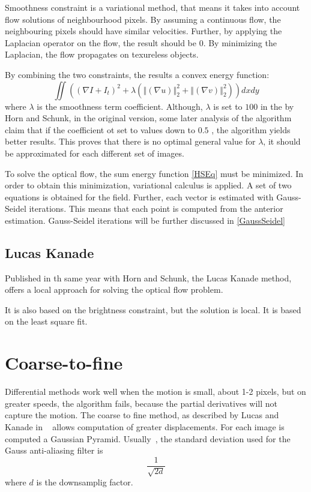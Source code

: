\documentclass[12pt,a4paper,twoside]{report}
\begin{document}
Smoothness constraint is a variational method, that means it takes into account flow solutions of neighbourhood pixels. By assuming a continuous flow, the neighbouring pixels should have similar velocities\cite{HSOpticalFlow}. Further, by applying the Laplacian operator on the flow, the result should be 0. By minimizing the Laplacian, the flow propagates on texureless objects.

By combining the two constraints, the results a convex energy function:
\begin{equation} \label{HSEq}
	\iint  ((\nabla I + I_t)^2 + \lambda(\left\Vert(\nabla u) \right\Vert_2^2 +\left\Vert(\nabla v) \right\Vert_2^2))dxdy
\end{equation}
where $\lambda$ is the smoothness term coefficient. Although, $\lambda$ is set to $100$ in the by Horn and Schunk, in the original version, some later analysis of the algorithm claim that if the coefficient ot set to values down to $0.5$ \cite{barron1994}, the algorithm yields better results. This proves that there is no optimal general value for $\lambda$, it should be approximated for each different set of images.

To solve the optical flow, the sum energy function \ref{HSEq} must be minimized. In order to obtain this minimization, variational calculus is applied. A set of two equations is obtained for the field.
Further, each vector is estimated with Gauss-Seidel iterations. This means that each point is computed from the anterior estimation. Gauss-Seidel iterations will be further discussed in \ref{GaussSeidel}


\subsection{Lucas Kanade}

Published in th same year with Horn and Schunk, the Lucas Kanade method, offers a local approach for solving the optical flow problem. 

It is also based on the brightness constraint, but the solution is local.
It is based on the least square fit.

\section{Coarse-to-fine}
Differential methods work well when the motion is small, about 1-2 pixels, but on greater speeds, the algorithm fails, because the partial derivatives will not capture the motion.
The coarse to fine method, as described by Lucas and Kanade in ~\cite{lucas1981} allows computation of greater displacements. For each image is computed a Gaussian Pyramid. Usually~\cite{sun2010}, the standard deviation used for the Gauss anti-aliasing filter is 
\begin{equation}
	\frac{1}{\sqrt{2d}}
\end{equation} where $d$ is the downsamplig factor.
\end{document}
